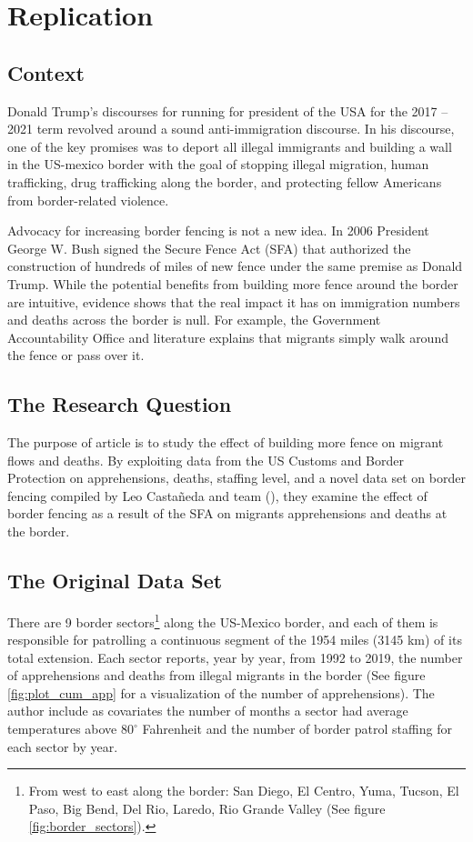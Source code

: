 \documentclass[titlepage]{article}
\theoremstyle{plain}
\theoremstyle{plain}
\begin{document}
\section*{Replication}

\subsection*{Context}

Donald Trump’s discourses for running for president of the USA for the 2017 – 2021 term revolved around a sound anti-immigration discourse. In his discourse, one of the key promises was to deport all illegal immigrants and building a wall in the US-mexico border with the goal of stopping illegal migration, human trafficking, drug trafficking along the border, and protecting fellow Americans from border-related violence.

Advocacy for increasing border fencing is not a new idea. In 2006 President George W. Bush signed the Secure Fence Act (SFA) that authorized the construction of hundreds of miles of new fence under the same premise as Donald Trump.
While the potential benefits from building more fence around the border are intuitive, evidence shows that the real impact it has on immigration numbers and deaths across the border is null. For example, the Government Accountability Office and literature explains that migrants simply walk around the fence or pass over it.


\subsection*{The Research Question}

The purpose of \cite{Bansak2022} article is to study the effect of building more fence on migrant flows and deaths. By exploiting data from the US Customs and Border Protection on apprehensions, deaths, staffing level, and a novel data set on border fencing compiled by Leo Castañeda and team (\cite*{castaneda2017}), they examine the effect of border fencing as a result of the SFA on migrants apprehensions and deaths at the border.

\subsection*{The Original Data Set}

There are 9 border sectors\footnote{From west to east along the border: San Diego, El Centro, Yuma, Tucson, El Paso, Big Bend, Del Rio, Laredo, Rio Grande Valley (See figure \ref{fig:border_sectors}). } along the US-Mexico border, and each of them is responsible for patrolling a continuous segment of the 1954 miles (3145 km) of its total extension. Each sector reports, year by year, from 1992 to 2019, the number of apprehensions and deaths from illegal migrants in the border (See figure \ref{fig:plot_cum_app} for a visualization of the number of apprehensions). The author include as covariates the number of months a sector had average temperatures above $80^{\circ}$ Fahrenheit and the number of border patrol staffing for each sector by year.
\end{document}
